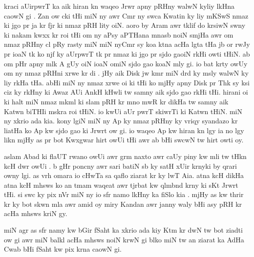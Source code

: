 \documentclass[a4paper]{article}
\begin{document}
kraci aUirpwrT ka aik hiran kn waqeo Jrwr apny pRHny walwN kyliy lkHna caowN gi	.
Zan ow cki tHi miN ny awr Cmr ny swca Kwatin ky liy  mKSwS  nmaz ki jgo pr ja kr fjr ki nmaz pRH lity oiN.
aoro by Aram  awr tklif do krsiwN swny ki nakam kwxx kr roi tHi om  ny aPsy aPTHana mnasb noiN smjHa awr om nmaz pRHny cl pRy rasty miN miN nyCmr sy koa ktna acHa lgta tHa jb or rwJy pr ioaN tk ko njf ky aUrpwrT tk pr nmaz  ki jgo pr sjdo gaoiN rkHi owti tHiN.
ab om pHr apny mlk A gUy oiN ioaN omiN sjdo gao koaN mly gi.
io bat krty owUy om ny nmaz pRHni xrwe kr di .
jHy aik Disk jw kmr miN drd ky msly walwN ky liy rkHa tHa.
abHi miN ny nmaz xrwe  oi ki tHi ko mjHy apny Disk pr Thk sy ksi ciz ky rkHny ki Awaz AUi AnkH kHwli tw samny aik sjdo gao rkHi tHi.
hirani oi ki halt miN nmaz mkml ki slam pRH kr mno mwR kr dikHa tw samny aik Katwn biTHIi mskra  roi tHiN.
io kwUi aUr pwrT skiwrTi ki Katwn tHiN.
miN ny xkrio ada kia.
kony lgiN miN ny Ap ky nmaz pRHny ky vriqy syandazo kr liatHa ko Ap kw sjdo gao ki Jrwrt ow gi.
io waqeo Ap kw hiran kn lgy ia no lgy likn mjHy as pr bot Kwxgwar  hirt owUi tHi awr ab bHi swcwN tw hirt owti oy.

aslam Abad ki flaUT rwano owUi awr grm naxto awr caUy piny kw mli tw tHkn kcH dwr owUi .
b gHr poncny awr sari batiN sb ky satH xUir krnyki by qrari owny lgi.
as vrh omara io cHwTa sa qaflo ziarat kr ky lwT Aia.
atna kcH dikHa atna kcH mhsws ko an tmam waqeat awr tjrbat kw qlmbnd krny ki sKt Jrwrt tHi.
si swc ky pix nVr miN ny io sfr namo lkHny ka fiSlo kia .
mjHy as kw thrir kr ky bot skwn mla awr amid oy miry Kandan awr janny waly bHi asy pRH kr acHa  mhsws kriN gy.

 miN agr as sfr namy kw bGir fSaht ka xkrio ada kiy Ktm kr dwN tw bot ziadti ow gi awr miN balkl acHa mhsws noiN krwN gi blko miN tw an ziarat ka AdHa Cwab bHi fSaht kw pix krna caowN gi.
\end{document}
